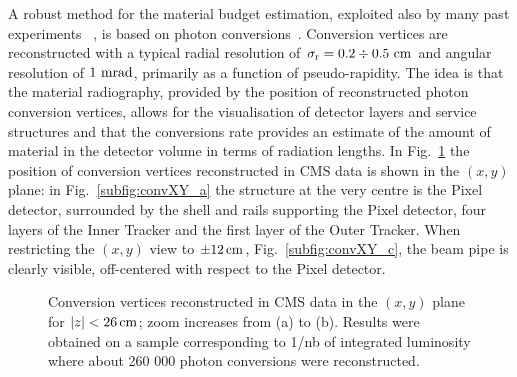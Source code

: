 \documentclass[a4paper]{jpconf}
\begin{document}
A robust method for the material budget estimation, exploited also by many
past experiments~\cite{steve} , is based on photon conversions~\cite{TRK-10-003}. 
Conversion vertices are reconstructed with a typical radial resolution of $\rm \sigma_r = 0.2 \div 0.5~cm$ and  angular resolution of  $1~{\rm mrad}$, primarily
as a function of pseudo-rapidity.
The idea is that the
material radiography, provided by the position of reconstructed photon
conversion vertices, allows for the visualisation of detector layers
and service structures and that the conversions rate provides an estimate of the amount of material in the
detector volume in terms of radiation lengths.
In Fig.~\ref{fig:convXY} the position of conversion vertices reconstructed in CMS data is shown in the $(x,y)$ plane:
in Fig.~\ref{subfig:convXY_a} the structure at the very centre is the Pixel detector,
surrounded by the shell and rails supporting the Pixel detector, four layers of the Inner Tracker and the first layer of the Outer Tracker.
When restricting the $(x,y)$ view to $\pm 12\rm \, cm$, Fig.~\ref{subfig:convXY_c}, the beam pipe is clearly visible, off-centered with respect to
the Pixel detector. 
%
\begin{figure}[t!]
  \begin{center}
    \caption{Conversion vertices reconstructed in CMS data in the $(x,y)$ plane for $|z|<26\rm \, cm$; zoom increases from (a) to (b). 
    Results were obtained on a sample corresponding to 1/nb of integrated luminosity where about 260 000 photon conversions were reconstructed. 
}
\label{fig:convXY}
\end{center}
\end{figure}
\end{document}
